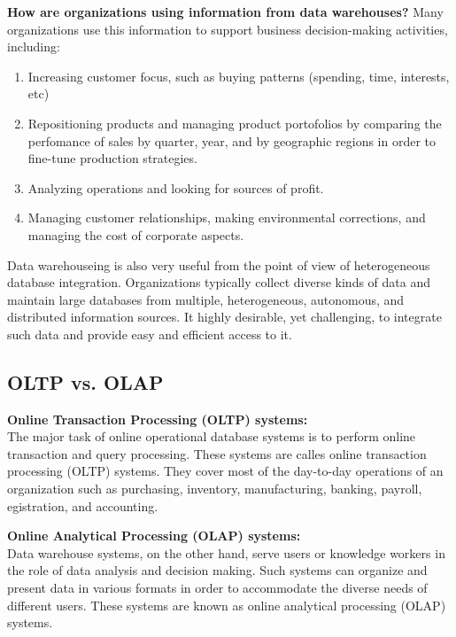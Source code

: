 		{\bf How are organizations using information from data warehouses?} Many organizations
		use this information to support business decision-making activities, including:
		\begin{enumerate}
			\item Increasing customer focus, such as buying patterns (spending, time, interests, etc)
			\item Repositioning products and managing product portofolios by comparing 
			the perfomance of sales by quarter, year, and by geographic regions in order to 
			fine-tune production strategies. 
			\item Analyzing operations and looking for sources of profit.
			\item Managing customer relationships, making environmental corrections, and
			managing the cost of corporate aspects. 
		\end{enumerate}

		Data warehouseing is also very useful from the point of view of heterogeneous database
		integration. Organizations typically collect diverse kinds of data and maintain large
		databases from multiple, heterogeneous, autonomous, and distributed information sources. 
		It highly desirable, yet challenging, to integrate such data and provide easy and
		efficient access to it. 
	\clearpage

	\subsection{OLTP vs. OLAP}

		{\bf Online Transaction Processing (OLTP) systems:} \\
		The major task of online operational database systems is to perform online
		transaction and query processing. These systems are calles online transaction processing 
		(OLTP) systems. They cover most of the day-to-day operations of an organization
		such as purchasing, inventory, manufacturing, banking, payroll, egistration, and 
		accounting.

		{\bf Online Analytical Processing (OLAP) systems:} \\
		Data warehouse systems, on the other hand, serve users or knowledge workers in the role
		of data analysis and decision making. Such systems can organize and present data in 
		various formats in order to accommodate the diverse needs of different users. 
		These systems are known as online analytical processing (OLAP) systems. 

